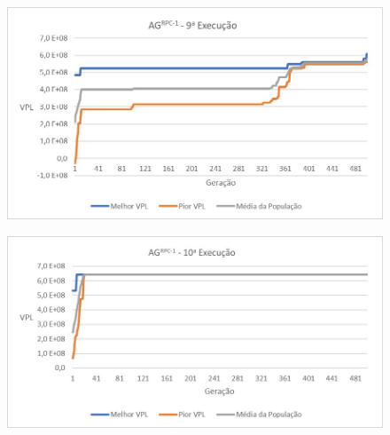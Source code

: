 \documentclass[12pt,a4paper]{report}
\begin{document}
\begin{figure}[H]
\centering

\includegraphics[scale=1]{AGRPC/9}
\end{figure}

\begin{figure}[H]
\centering

\includegraphics[scale=1]{AGRPC/10}
\end{figure}
\end{document}
